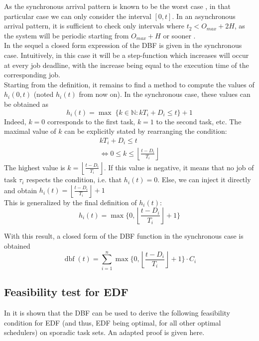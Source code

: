 \documentclass[a4paper,10pt]{article}
\newcommand{\dbf}[1]{\operatorname{dbf}(#1)}
\begin{document}
As the synchronous arrival pattern is known to be the worst case
\cite{liu1973scheduling}, in that particular case we can only consider the
interval $[0, t]$. In an asynchronous arrival pattern, it is sufficient to check
only intervals where $t_2 < O_{max} + 2H$, as the system will be
periodic starting from $O_{max} + H$ or sooner \cite{leung1982complexity}.\\

In the sequel a closed form expression of the DBF is given in the synchronous
case. Intuitively, in this case it will be a step-function which increases will
occur at every job deadline, with the increase being equal to the execution time of the corresponding job.\\

Starting from the definition, it remains to find a method to compute the values
of $h_i(0, t)$ (noted $h_i(t)$ from now on). In the synchronous case, these
values can be obtained as 
\[
	h_i(t) = \operatorname{max} \; \{ k \in \mathbb{N} :
	k T_i  + D_i \leq t \} + 1
\]
Indeed, $k = 0$ corresponds to the first task, $k = 1$ to the second task, etc.
The maximal value of $k$ can be explicitly stated by rearranging the condition:
\[
	\begin{array}{c}
		k T_i + D_i \leq t \\
		\iff 0 \leq k \leq \left\lfloor \frac{t - D_i}{T_i} \right\rfloor
	\end{array}
\]
The highest value is $k = \left\lfloor \frac{t - D_i}{T_i} \right\rfloor$. If
this value is negative, it means that no job of task $\tau_i$ respects the condition, i.e.
that $h_i(t) = 0$. Else, we can inject it directly and obtain $h_i(t) =
\left\lfloor \frac{t - D_i}{T_i} \right\rfloor + 1$\\

This is generalized by the final definition of $h_i(t)$: 
\[
	h_i(t) = \operatorname{max} \{ 0, \left\lfloor \frac{t - D_i}{T_i}
	\right\rfloor + 1\}
\]

With this result, a closed form of the DBF function in the synchronous case is
obtained 
\[
	\dbf{t} = \sum_{i=1}^{n} \operatorname{max} \{ 0, \left\lfloor \frac{t -
	D_i}{T_i} \right\rfloor + 1 \} \cdot C_i
\]

\subsection{Feasibility test for EDF}

In \cite{baruah1990algorithms} it is shown that the DBF can be used to
derive the following feasibility condition for EDF (and thus, EDF being
optimal, for all other optimal schedulers) on sporadic task sets. An adapted
proof is given here.
\end{document}
